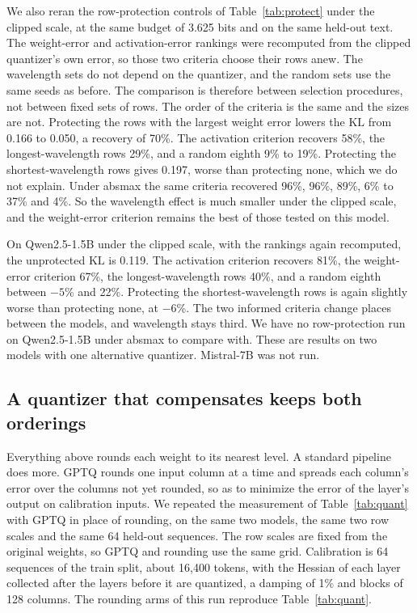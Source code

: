 \documentclass[journal]{IEEEtran}
\newcommand{\KL}{\mathrm{KL}}
\begin{document}
We also reran the row-protection controls of Table~\ref{tab:protect} under the clipped scale, at
the same budget of 3.625 bits and on the same held-out text. The weight-error and
activation-error rankings were recomputed from the clipped quantizer's own error, so those two
criteria choose their rows anew. The wavelength sets do not depend on the quantizer, and the
random sets use the same seeds as before. The comparison is therefore between selection
procedures, not between fixed sets of rows. The order of the criteria is the
same and the sizes are not. Protecting the rows with the largest weight error lowers the $\KL$
from 0.166 to 0.050, a recovery of 70\%. The activation criterion recovers 58\%, the
longest-wavelength rows 29\%, and a random eighth 9\% to 19\%. Protecting the shortest-wavelength
rows gives 0.197, worse than protecting none, which we do not explain. Under absmax the same
criteria recovered 96\%, 96\%, 89\%, 6\% to 37\% and 4\%. So the wavelength effect is much
smaller under the clipped scale, and the weight-error criterion remains the best of those
tested on this model.

On Qwen2.5-1.5B under the clipped scale, with the rankings again recomputed, the unprotected
$\KL$ is 0.119. The activation criterion recovers 81\%, the weight-error criterion 67\%, the
longest-wavelength rows 40\%, and a random eighth between $-5$\% and 22\%. Protecting the
shortest-wavelength rows is again slightly worse than protecting none, at $-6$\%. The two
informed criteria change places between the models, and wavelength stays third. We have no
row-protection run on Qwen2.5-1.5B under absmax to compare with. These are results on two models
with one alternative quantizer. Mistral-7B was not run.

\subsection{A quantizer that compensates keeps both orderings}\label{sec:proj:gptq}

Everything above rounds each weight to its nearest level. A standard pipeline does more. GPTQ
\citep{frantar2023gptq} rounds one input column at a time and spreads each column's error over
the columns not yet rounded, so as to minimize the error of the layer's output on calibration
inputs. We repeated the measurement of Table~\ref{tab:quant} with GPTQ in place of rounding, on
the same two models, the same two row scales and the same 64 held-out sequences. The row scales
are fixed from the original weights, so GPTQ and rounding use the same grid. Calibration is 64
sequences of the train split, about 16{,}400 tokens, with the Hessian of each layer collected
after the layers before it are quantized, a damping of 1\% and blocks of 128 columns. The
rounding arms of this run reproduce Table~\ref{tab:quant}.
\end{document}
